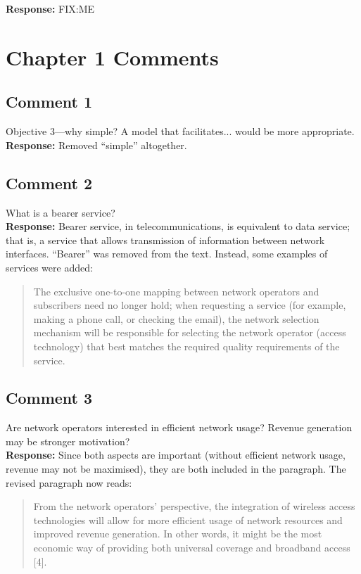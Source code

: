\documentclass[10pt,a4paper,notitlepage]{article}
\numberwithin{equation}{section}
\begin{document}
\textbf{Response:}
FIX:ME

\clearpage

\setcounter{section}{0}
\renewcommand{\thesection}{C\arabic{section}}
\renewcommand{\thesubsection}{C\arabic{section}.\arabic{subsection}}
\section{Chapter 1 Comments}
\subsection{Comment 1}
Objective 3---why simple? A model that facilitates... would be more appropriate.\\[-2ex]

\textbf{Response:}
Removed ``simple'' altogether.

\subsection{Comment 2}
What is a bearer service?\\[-2ex]

\textbf{Response:}
Bearer service, in telecommunications, is equivalent to data service; that is, a service that allows transmission of information between network interfaces. ``Bearer'' was removed from the text. Instead, some examples of services were added:
\begin{quote}
The exclusive one-to-one mapping between network operators and subscribers need no longer hold; when requesting a service (for example, making a phone call, or checking the email), the network selection mechanism will be responsible for selecting the network operator (access technology) that best matches the required quality requirements of the service.
\end{quote}

\subsection{Comment 3}
Are network operators interested in efficient network usage? Revenue generation may be stronger motivation?\\[-2ex]

\textbf{Response:}
Since both aspects are important (without efficient network usage, revenue may not be maximised), they are both included in the paragraph. The revised paragraph now reads:
\begin{quote}
From the network operators' perspective, the integration of wireless access technologies will allow for more efficient usage of network resources and improved revenue generation. In other words, it might be the most economic way of providing both universal coverage and broadband access [4].
\end{quote}
\end{document}

